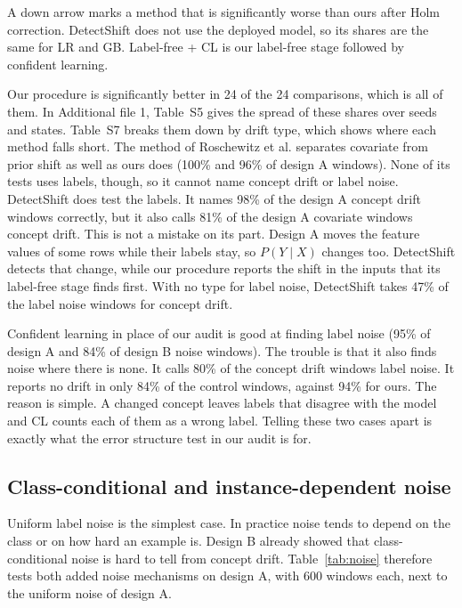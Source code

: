 \documentclass[pdflatex,referee,lineno,sn-basic]{sn-jnl}
\begin{document}
A down arrow marks a method that is significantly worse than ours after Holm correction. DetectShift does not use the deployed model, so its shares are the same for LR and GB. Label-free + CL is our label-free stage followed by confident learning.

Our procedure is significantly better in 24 of the 24 comparisons, which is all of them. In Additional file 1, Table~S5 gives the spread of these shares over seeds and states. Table~S7 breaks them down by drift type, which shows where each method falls short. The method of Roschewitz et al. separates covariate from prior shift as well as ours does (100\% and 96\% of design A windows). None of its tests uses labels, though, so it cannot name concept drift or label noise. DetectShift does test the labels. It names 98\% of the design A concept drift windows correctly, but it also calls 81\% of the design A covariate windows concept drift. This is not a mistake on its part. Design A moves the feature values of some rows while their labels stay, so $P(Y\mid X)$ changes too. DetectShift detects that change, while our procedure reports the shift in the inputs that its label-free stage finds first. With no type for label noise, DetectShift takes 47\% of the label noise windows for concept drift.

Confident learning in place of our audit is good at finding label noise (95\% of design A and 84\% of design B noise windows). The trouble is that it also finds noise where there is none. It calls 80\% of the concept drift windows label noise. It reports no drift in only 84\% of the control windows, against 94\% for ours. The reason is simple. A changed concept leaves labels that disagree with the model and CL counts each of them as a wrong label. Telling these two cases apart is exactly what the error structure test in our audit is for.

\subsection{Class-conditional and instance-dependent noise}\label{sec:res-noise}

Uniform label noise is the simplest case. In practice noise tends to depend on the class or on how hard an example is. Design B already showed that class-conditional noise is hard to tell from concept drift. Table~\ref{tab:noise} therefore tests both added noise mechanisms on design A, with 600 windows each, next to the uniform noise of design A.
\end{document}
